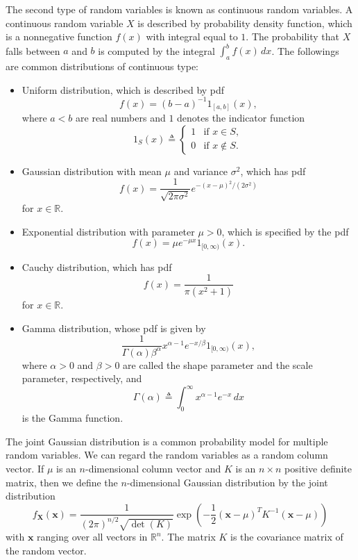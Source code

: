 The second type of random variables is known as continuous random variables. A continuous random variable $X$ is described by probability density function, which is a nonnegative function $f(x)$ with integral equal to $1$. The probability that $X$ falls between $a$ and $b$ is computed by the integral $\int_a^b f(x)\, dx$. The followings are common distributions of continuous type:
\begin{itemize}
    \item Uniform distribution, which is described by pdf
    \[
    f(x)=(b-a)^{-1}1_{[a,b]}(x),
    \]
    where $a<b$ are real numbers and $1$ denotes the indicator function
    \begin{equation}
    1_S(x)\triangleq
    \begin{cases}
    1 & \text{if } x\in S,\\
    0 & \text{if } x\notin S.
    \end{cases}
    \tag{1.1}
    \end{equation}
    \item Gaussian distribution with mean $\mu$ and variance $\sigma^2$, which has pdf
    \[
    f(x)=\frac{1}{\sqrt{2\pi\sigma^2}}e^{-(x-\mu)^2/(2\sigma^2)}
    \]
    for $x\in \mathbb{R}$.
    \item Exponential distribution with parameter $\mu>0$, which is specified by the pdf
    \[
    f(x)=\mu e^{-\mu x}1_{[0,\infty)}(x).
    \]
    \item Cauchy distribution, which has pdf
    \[
    f(x)=\frac{1}{\pi(x^2+1)}
    \]
    for $x\in \mathbb{R}$.
    \item Gamma distribution, whose pdf is given by
    \begin{equation}
    \frac{1}{\Gamma(\alpha)\beta^{\alpha}}x^{\alpha-1}e^{-x/\beta}1_{[0,\infty)}(x),
    \tag{1.2}
    \end{equation}
    where $\alpha>0$ and $\beta>0$ are called the shape parameter and the scale parameter, respectively, and
    \[
    \Gamma(\alpha)\triangleq \int_0^{\infty} x^{\alpha-1}e^{-x}\, dx
    \]
    is the Gamma function.
\end{itemize}

The joint Gaussian distribution is a common probability model for multiple random variables. We can regard the random variables as a random column vector. If $\mu$ is an $n$-dimensional column vector and $K$ is an $n\times n$ positive definite matrix, then we define the $n$-dimensional Gaussian distribution by the joint distribution
\[
f_{\mathbf{X}}(\mathbf{x})
=
\frac{1}{(2\pi)^{n/2}\sqrt{\det(K)}}
\exp\left(
-\frac{1}{2}(\mathbf{x}-\mu)^T K^{-1}(\mathbf{x}-\mu)
\right)
\]
with $\mathbf{x}$ ranging over all vectors in $\mathbb{R}^n$. The matrix $K$ is the covariance matrix of the random vector.

